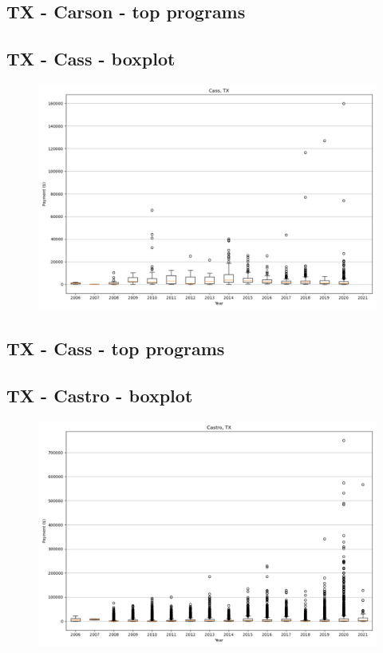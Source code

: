 \subsection*{TX - Carson - top programs}

\newpage
\subsection*{TX - Cass - boxplot}
\begin{figure}[h]
\centering
\includegraphics[width=7in]{../output/boxplots/counties/Cass-TX_boxplot.png}
\end{figure}


\subsection*{TX - Cass - top programs}

\newpage
\subsection*{TX - Castro - boxplot}
\begin{figure}[h]
\centering
\includegraphics[width=7in]{../output/boxplots/counties/Castro-TX_boxplot.png}
\end{figure}


